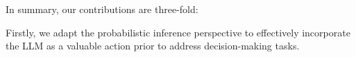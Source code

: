 \documentclass{article} %
\theoremstyle{plain}
\theoremstyle{definition}
\theoremstyle{remark}
\begin{document}





\iffalse
In summary, our contributions are three-fold:

Firstly, we adapt the probabilistic inference perspective to effectively incorporate the LLM as a valuable action prior to address decision-making tasks. 
\end{document}
